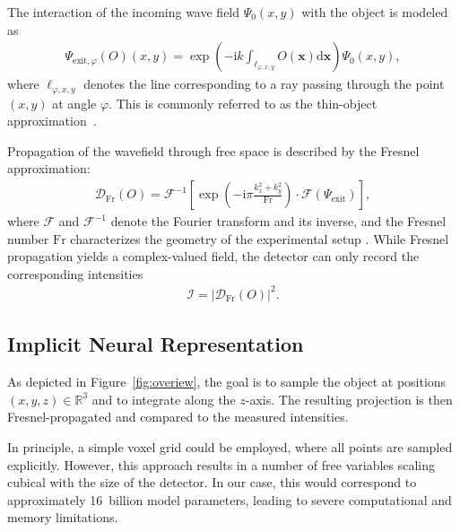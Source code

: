 \documentclass{article}
\def\x{{\mathbf x}}
\begin{document}
The interaction of the incoming wave field $\Psi_{0} \left( x,y \right)$ with the object is modeled as
\begin{align}
	\Psi_{\text{exit}, \varphi} \left( O \right) \left( x,y \right) =
	\exp \left( - \mathrm{i}k  \int_{\ell_{\varphi, x, y}} O \left( \x \right) \mathrm{d}\x \right) 
	\Psi_{0}\left( x,y \right),
\end{align}
where $\ell_{\varphi, x, y}$ denotes the line corresponding to a ray passing through the point $\left( x,y \right)$ at angle $\varphi$. This is commonly referred to as the thin-object approximation~\cite{paganinCoherentXrayOptics2006a}.  

Propagation of the wavefield through free space is described by the Fresnel approximation:  
\begin{align}
	\mathcal{D}_{\text{Fr}} \left( O \right) = 
	\mathcal{F}^{-1} \left[ 
		\exp \left( - \mathrm{i} \pi \frac{k_{x}^{2} + k_{y}^{2}}{\text{Fr}} \right) 
		\cdot \mathcal{F} \left( \Psi_{\text{exit}} \right)
	\right],
	\label{eq:fresnel}
\end{align}
where $\mathcal{F}$ and $\mathcal{F}^{-1}$ denote the Fourier transform and its inverse, and the Fresnel number $\text{Fr}$ characterizes the geometry of the experimental setup \cite{paganinCoherentXrayOptics2006a}.
While Fresnel propagation yields a complex-valued field, the detector can only record the corresponding intensities
\begin{align}
	\mathcal{I} = \left| \mathcal{D}_{\text{Fr}} \left( O \right) \right|^{2}.
\end{align}

\subsection{Implicit Neural Representation}
As depicted in Figure~\ref{fig:overiew}, the goal is to sample the object at positions $\left( x,y,z \right) \in \mathbb{R}^{3}$ and to integrate along the $z$-axis.  
The resulting projection is then Fresnel-propagated and compared to the measured intensities.  

In principle, a simple voxel grid could be employed, where all points are sampled explicitly.  
However, this approach results in a number of free variables scaling cubical with the size of the detector.  
In our case, this would correspond to approximately 16~billion model parameters, leading to severe computational and memory limitations.  
\end{document}
